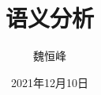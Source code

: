 \documentclass[]{beamer}
\title[语义分析]{语义分析}
\author[魏恒峰]{\large 魏恒峰}
\institute{hfwei@nju.edu.cn}
\date{2021年12月10日}
\begin{document}
\maketitle




\thankyou{}

\end{document}
